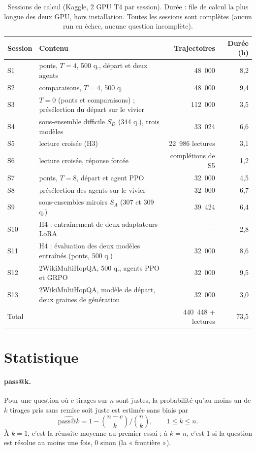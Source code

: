 \documentclass[11pt,a4paper]{article}
\begin{document}
\begin{table}[h]\centering\small
\begin{tabular}{>{\raggedright\arraybackslash}p{1.1cm}>{\raggedright\arraybackslash}p{6.6cm}rr}\toprule
Session & Contenu & Trajectoires & Durée (h)\\\midrule
S1 & ponts, $T = 4$, 500 q., départ et deux agents & 48~000 & 8,2\\
S2 & comparaisons, $T = 4$, 500 q. & 48~000 & 9,4\\
S3 & $T = 0$ (ponts et comparaisons) ; présélection du départ sur le vivier & 112~000 & 3,5\\
S4 & sous-ensemble difficile $S_D$ (344 q.), trois modèles & 33~024 & 6,6\\
S5 & lecture croisée (H3) & 22~986 lectures & 3,1\\
S6 & lecture croisée, réponse forcée & complétions de S5 & 1,2\\
S7 & ponts, $T = 8$, départ et agent PPO & 32~000 & 4,5\\
S8 & présélection des agents sur le vivier & 32~000 & 6,7\\
S9 & sous-ensembles miroirs $S_A$ (307 et 309 q.) & 39~424 & 6,4\\
S10 & H4 : entraînement de deux adaptateurs LoRA & -- & 2,8\\
S11 & H4 : évaluation des deux modèles entraînés (ponts, 500 q.) & 32~000 & 8,6\\
S12 & 2WikiMultiHopQA, 500 q., agents PPO et GRPO & 32~000 & 9,5\\
S13 & 2WikiMultiHopQA, modèle de départ, deux graines de génération & 32~000 & 3,0\\\midrule
Total & & 440~448 + lectures & 73,5\\\bottomrule
\end{tabular}
\caption{Sessions de calcul (Kaggle, 2 GPU T4 par session). Durée : file de calcul la plus longue des deux GPU, hors installation. Toutes les sessions sont complètes (aucun run en échec, aucune question incomplète).}\label{tab:sessions}
\end{table}

\section{Statistique}\label{sec:stat-p2}

\paragraph{pass@k.} Pour une question où $c$ tirages sur $n$ sont justes, la probabilité qu'au moins un de $k$ tirages pris sans remise soit juste est estimée sans biais par \citep{chen2021evaluating}
\begin{equation}
\widehat{\text{pass@}k} = 1 - \binom{n-c}{k}\Big/\binom{n}{k}, \qquad 1 \le k \le n.
\end{equation}
À $k = 1$, c'est la réussite moyenne au premier essai ; à $k = n$, c'est 1 si la question est résolue au moins une fois, 0 sinon (la « frontière »).
\end{document}
